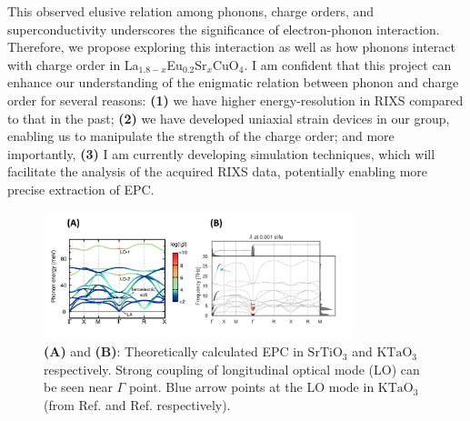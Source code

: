 \documentclass[11pt]{article}
\begin{document}
This observed elusive relation among phonons, charge orders, and superconductivity underscores the significance of electron-phonon interaction. 
Therefore, we propose exploring this interaction as well as how phonons interact with charge order in {La$_{1.8-x}$Eu$_{0.2}$Sr$_x$CuO$_{4}$}. 
I am confident that this project can enhance our understanding of the enigmatic relation between phonon and charge order for several reasons: 
\textbf{(1)} we have higher energy-resolution in RIXS compared to that in the past; 
\textbf{(2)} we have developed uniaxial strain devices in our group, enabling us to manipulate the strength of the charge order; 
and more importantly, \textbf{(3)} I am currently developing simulation techniques, which will facilitate the analysis of the acquired RIXS data, potentially enabling more precise extraction of EPC.
\begin{figure}[!t]
    \centering
    \includegraphics[width=0.8\textwidth]{figures/new_second_figure.jpg}
    \caption{\textbf{(A)} and \textbf{(B)}: Theoretically calculated EPC in $\mathrm{SrTiO_3}$ and $\mathrm{KTaO_3}$ respectively. Strong coupling of longitudinal optical mode (LO) can be seen near $\Gamma$ point. Blue arrow points at the LO mode in  $\mathrm{KTaO_3}$ (from Ref.\cite{zhou_electron-phonon_2018} and Ref.\cite{esswein_first-principles_2023} respectively).}  
\end{figure}
\end{document}
